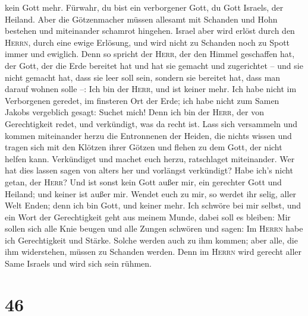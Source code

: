 kein Gott mehr.  Fürwahr, du bist ein verborgener Gott,
du Gott Israels, der Heiland.  Aber die Götzenmacher
müssen allesamt mit Schanden und Hohn bestehen und miteinander schamrot
hingehen.  Israel aber wird erlöst durch den
\textsc{Herrn}, durch eine ewige Erlösung, und wird nicht zu Schanden
noch zu Spott immer und ewiglich.  Denn so spricht der
\textsc{Herr}, der den Himmel geschaffen hat, der Gott, der die Erde
bereitet hat und hat sie gemacht und zugerichtet -- und sie nicht
gemacht hat, dass sie leer soll sein, sondern sie bereitet hat, dass man
darauf wohnen solle --: Ich bin der \textsc{Herr}, und ist keiner mehr.
 Ich habe nicht im Verborgenen geredet, im finsteren Ort
der Erde; ich habe nicht zum Samen Jakobs vergeblich gesagt: Suchet
mich! Denn ich bin der \textsc{Herr}, der von Gerechtigkeit redet, und
verkündigt, was da recht ist.  Lass sich versammeln und
kommen miteinander herzu die Entronnenen der Heiden, die nichts wissen
und tragen sich mit den Klötzen ihrer Götzen und flehen zu dem Gott, der
nicht helfen kann.  Verkündiget und machet euch herzu,
ratschlaget miteinander. Wer hat dies lassen sagen von alters her und
vorlängst verkündigt? Habe ich's nicht getan, der \textsc{Herr}? Und ist
sonst kein Gott außer mir, ein gerechter Gott und Heiland; und keiner
ist außer mir.  Wendet euch zu mir, so werdet ihr selig,
aller Welt Enden; denn ich bin Gott, und keiner mehr. 
Ich schwöre bei mir selbst, und ein Wort der Gerechtigkeit geht aus
meinem Munde, dabei soll es bleiben: Mir sollen sich alle Knie beugen
und alle Zungen schwören  und sagen: Im \textsc{Herrn}
habe ich Gerechtigkeit und Stärke. Solche werden auch zu ihm kommen;
aber alle, die ihm widerstehen, müssen zu Schanden werden.
 Denn im \textsc{Herrn} wird gerecht aller Same Israels
und wird sich sein rühmen.

\hypertarget{section-45}{%
\section{46}\label{section-45}}


